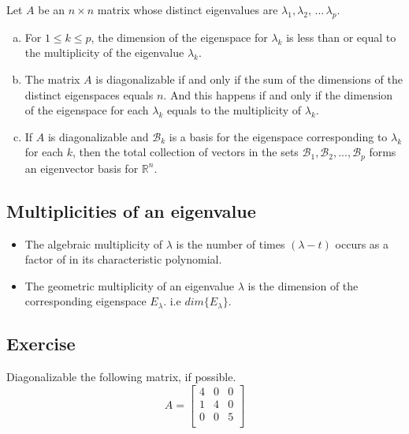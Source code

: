 \documentclass[aima104_lecturenotes_ku.tex]{subfiles}
\begin{document}
\begin{theorem}
  Let $A$ be an $n \times n$ matrix whose distinct eigenvalues are $\lambda_1, \lambda_2,\, ...\, \lambda_p$.
  \begin{enumerate}[a. ]
  \item For $1 \leq k \leq p$, the dimension of the eigenspace for $\lambda_k$ is less than or equal to the multiplicity of the eigenvalue $\lambda_k$.
  \item The matrix $A$ is diagonalizable if and only if the sum of the dimensions of the distinct eigenspaces equals $n$. And this happens if and only if the dimension of the eigenspace for each $\lambda_k$ equals to the multiplicity of $\lambda_k$.
   \item If $A$ is diagonalizable and $\mathcal{B}_k$ is a basis for the eigenspace corresponding to $\lambda_k$ for each $k$, then the total collection of vectors in the sets $\mathcal{B}_1, \mathcal{B}_2, ..., \mathcal{B}_p$ forms an eigenvector basis for $\mathbb{R}^n$.
  \end{enumerate}
\end{theorem}

\subsection{Multiplicities of an eigenvalue}
\begin{itemize}
\item The algebraic multiplicity of $\lambda$ is the number of times $(\lambda - t)$ occurs as a factor of in its characteristic polynomial.
\item The geometric multiplicity of an eigenvalue $\lambda$ is the dimension of the corresponding eigenspace $E_{\lambda}$. i.e $dim\{E_{\lambda}\}$.
\end{itemize}
\subsection{Exercise}
Diagonalizable the following matrix, if possible.
$$A=
\begin{bmatrix}
  4 & 0 & 0  \\
  1 & 4 & 0  \\
   0& 0 & 5  \\
\end{bmatrix}
$$
\end{document}
